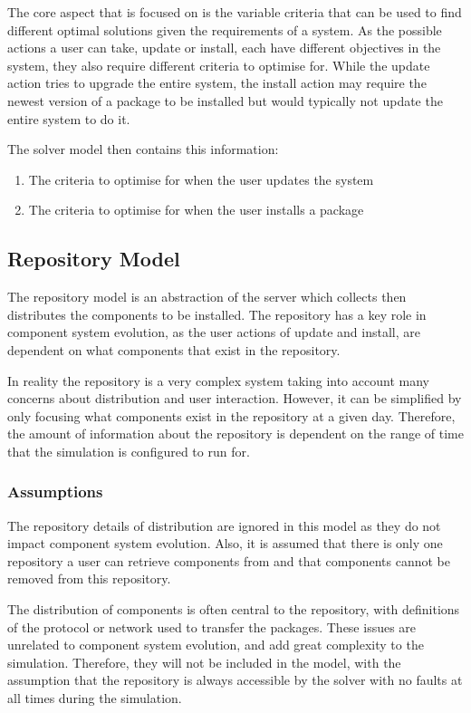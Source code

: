 The core aspect that is focused on is the variable criteria that can be used to find different optimal solutions given the requirements of a system.
As the possible actions a user can take, update or install, each have different objectives in the system,
they also require different criteria to optimise for.
While the update action tries to upgrade the entire system, 
the install action may require the newest version of a package to be installed but would typically not update the entire system to do it. 

The solver model then contains this information:
\begin{enumerate}
  \item The criteria to optimise for when the user updates the system
  \item The criteria to optimise for when the user installs a package
\end{enumerate}

\subsection{Repository Model}
The repository model is an abstraction of the server which collects then distributes the components to be installed.
The repository has a key role in component system evolution, 
as the user actions of update and install, are dependent on what components that exist in the repository.

In reality the repository is a very complex system taking into account many concerns about distribution and user interaction.
However, it can be simplified by only focusing what components exist in the repository at a given day. 
Therefore, the amount of information about the repository is dependent on the range of time that the simulation is configured to run for.

\subsubsection{Assumptions}
The repository details of distribution are ignored in this model as they do not impact component system evolution.
Also, it is assumed that there is only one repository a user can retrieve components from and that components cannot be removed from this repository.

The distribution of components is often central to the repository, 
with definitions of the protocol or network used to transfer the packages.
These issues are unrelated to component system evolution, and add great complexity to the simulation.
Therefore, they will not be included in the model, with the assumption that the repository is always accessible by the solver with no faults at all times during the simulation.

